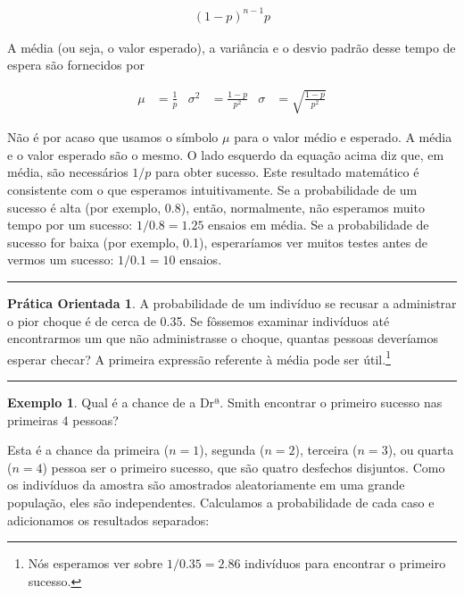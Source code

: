 \documentclass[
]{book}
\theoremstyle{definition}
\theoremstyle{definition}
\newtheorem{example}{Exemplo}[chapter]
\theoremstyle{definition}
\newtheorem{exercise}{Prática Orientada}[chapter]
\theoremstyle{definition}
\theoremstyle{remark}
\begin{document}
\begin{eqnarray}
(1-p)^{n-1}p
\end{eqnarray}

A média (ou seja, o valor esperado), a variância e o desvio padrão desse tempo de espera são fornecidos por

\begin{align*}
  \mu &= \frac{1}{p}
    &\sigma^2&=\frac{1-p}{p^2}
    &\sigma &= \sqrt{\frac{1-p}{p^2}}
\end{align*}

Não é por acaso que usamos o símbolo \(\mu\) para o valor médio e esperado. A média e o valor esperado são o mesmo. O lado esquerdo da equação acima diz que, em média, são necessários \(1/p\) para obter sucesso. Este resultado matemático é consistente com o que esperamos intuitivamente. Se a probabilidade de um sucesso é alta (por exemplo, 0.8), então, normalmente, não esperamos muito tempo por um sucesso: \(1/0.8 = 1.25\) ensaios em média. Se a probabilidade de sucesso for baixa (por exemplo, 0.1), esperaríamos ver muitos testes antes de vermos um sucesso: \(1/0.1 = 10\) ensaios.

\begin{center}\rule{0.5\linewidth}{0.5pt}\end{center}

\begin{exercise}
\protect\hypertarget{exr:unnamed-chunk-123}{}{\label{exr:unnamed-chunk-123} }
A probabilidade de um indivíduo se recusar a administrar o pior choque é de cerca de 0.35. Se fôssemos examinar indivíduos até encontrarmos um que não administrasse o choque, quantas pessoas deveríamos esperar checar? A primeira expressão referente à média pode ser útil.\footnote{Nós esperamos ver sobre \(1/0.35 = 2.86\) indivíduos para encontrar o primeiro sucesso.}
\end{exercise}

\begin{center}\rule{0.5\linewidth}{0.5pt}\end{center}

\begin{example}
\protect\hypertarget{exm:unnamed-chunk-124}{}{\label{exm:unnamed-chunk-124} }Qual é a chance de a Drª. Smith encontrar o primeiro sucesso nas primeiras 4 pessoas?
\end{example}

Esta é a chance da primeira (\(n=1\)), segunda (\(n=2\)), terceira (\(n=3\)), ou quarta (\(n=4\)) pessoa ser o primeiro sucesso, que são quatro desfechos disjuntos. Como os indivíduos da amostra são amostrados aleatoriamente em uma grande população, eles são independentes. Calculamos a probabilidade de cada caso e adicionamos os resultados separados:
\end{document}

